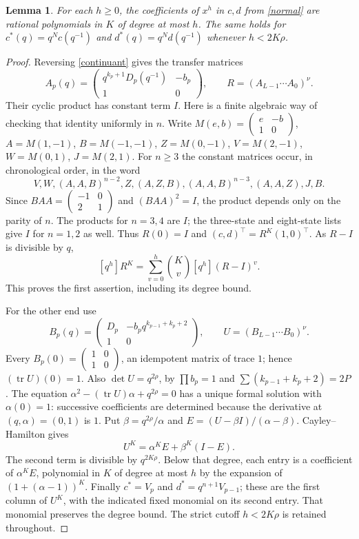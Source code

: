 \documentclass[11pt,a4paper]{article}
\newtheorem{lemma}[theorem]{Lemma}
\begin{document}
\begin{lemma}\label{jets}
For each $h\ge0$, the coefficients of $x^h$ in $c,d$ from
\eqref{normal} are rational polynomials in $K$ of degree at most $h$.
The same holds for $c^*(q)=q^Nc(q^{-1})$ and
$d^*(q)=q^Nd(q^{-1})$ whenever $h<2K\rho$.
\end{lemma}
\begin{proof}
Reversing \eqref{continuant} gives the transfer matrices
\[
 A_p(q)=\begin{pmatrix}q^{k_p+1}D_p(q^{-1})&-b_p\\1&0\end{pmatrix},
 \qquad R=(A_{L-1}\cdots A_0)^\nu.
\]
Their cyclic product has constant term $I$. Here is a finite algebraic
way of checking that identity uniformly in $n$. Write $M(e,b)=
\left(\begin{smallmatrix}e&-b\\1&0\end{smallmatrix}\right)$,
$A=M(1,-1)$, $B=M(-1,-1)$, $Z=M(0,-1)$,
$V=M(2,-1)$, $W=M(0,1)$, $J=M(2,1)$. For $n\ge3$ the
constant matrices occur, in chronological order, in the word
\[
 V,W,(A,A,B)^{n-2},Z,(A,Z,B),(A,A,B)^{n-3},(A,A,Z),J,B.
\]
Since $BAA=\left(\begin{smallmatrix}-1&0\\2&1\end{smallmatrix}\right)$
and $(BAA)^2=I$, the product depends only on the parity of $n$.
The products for $n=3,4$ are $I$; the three-state and eight-state lists
give $I$ for $n=1,2$ as well. Thus $R(0)=I$ and
$(c,d)^\top=R^K(1,0)^\top$. As $R-I$ is divisible by $q$,
\[
 [q^h]R^K=\sum_{v=0}^h\binom Kv[q^h](R-I)^v.
\]
This proves the first assertion, including its degree bound.

For the other end use
\[
 B_p(q)=\begin{pmatrix}D_p&-b_pq^{k_{p-1}+k_p+2}\\1&0\end{pmatrix},
 \qquad U=(B_{L-1}\cdots B_0)^\nu.
\]
Every $B_p(0)=\left(\begin{smallmatrix}1&0\\1&0\end{smallmatrix}\right)$,
an idempotent matrix of trace $1$; hence $(\operatorname{tr}U)(0)=1$.
Also $\det U=q^{2\rho}$, by $\prod b_p=1$ and
$\sum(k_{p-1}+k_p+2)=2P$.
The equation $\alpha^2-(\operatorname{tr}U)\alpha+q^{2\rho}=0$
has a unique formal solution with $\alpha(0)=1$: successive coefficients
are determined because the derivative at $(q,\alpha)=(0,1)$ is $1$.
Put $\beta=q^{2\rho}/\alpha$ and
$E=(U-\beta I)/(\alpha-\beta)$. Cayley--Hamilton gives
\[
 U^K=\alpha^KE+\beta^K(I-E).
\]
The second term is divisible by $q^{2K\rho}$. Below that degree, each
entry is a coefficient of $\alpha^KE$, polynomial in $K$ of degree at
most $h$ by the expansion of $(1+(\alpha-1))^K$.
Finally $c^*=V_p$ and $d^*=q^{n+1}V_{p-1}$; these are the first column
of $U^K$, with the indicated fixed monomial on its second entry.
That monomial preserves the degree bound. The strict cutoff
$h<2K\rho$ is retained throughout.
\end{proof}
\end{document}
